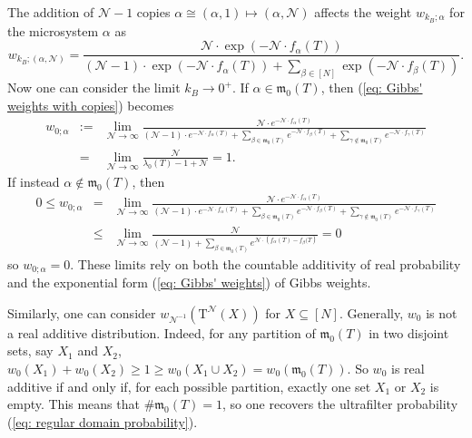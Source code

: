 \documentclass[11pt,british,reqno]{article}
\numberwithin{equation}{section}
\numberwithin{figure}{section}
\numberwithin{table}{section}
\theoremstyle{definition}
\theoremstyle{definition}
\theoremstyle{plain}
\theoremstyle{plain}
\theoremstyle{remark}
\theoremstyle{plain}
\numberwithin{equation}{section}
\numberwithin{figure}{section}
\numberwithin{table}{section}
\theoremstyle{plain}
\begin{document}
The addition of $\mathcal{N}-1$ copies
$\alpha\cong(\alpha,1)\mapsto(\alpha,\mathcal{N})$ affects the weight $w_{k_{B};\alpha}$ for the microsystem $\alpha$ as 
\begin{equation}
w_{k_{B};(\alpha,\mathcal{N})}=\frac{\mathcal{N}\cdot\exp\left(-\mathcal{N}\cdot f_{\alpha}(T)\right)}{(\mathcal{N}-1)\cdot\exp\left(-\mathcal{N}\cdot f_{\alpha}(T)\right)+{\displaystyle \sum_{\beta\in[N]}}\exp\left(-\mathcal{N}\cdot f_{\beta}(T)\right)}.\label{eq: Gibbs' weights with copies}
\end{equation}
Now one can consider the limit $k_{B}\rightarrow0^{+}$. If $\alpha\in\mathfrak{m}_{0}(T)$,
then (\ref{eq: Gibbs' weights with copies}) becomes 
\begin{eqnarray}
\displaystyle
w_{0;\alpha} & := & \lim_{\mathcal{N}\rightarrow\infty}\frac{\mathcal{N}\cdot e^{-\mathcal{N}\cdot f_{\alpha}(T)}}{(\mathcal{N}-1)\cdot e^{-\mathcal{N}\cdot f_{\alpha}(T)}+{\displaystyle \sum_{\beta\in\mathfrak{m}_{0}(T)}}e^{-\mathcal{N}\cdot f_{\beta}(T)}+{\displaystyle \sum_{\gamma\notin\mathfrak{m}_{0}(T)}}e^{-\mathcal{N}\cdot f_{\gamma}(T)}} \nonumber \\
& = & \lim_{\mathcal{N}\rightarrow\infty}\frac{\mathcal{N}}{\lambda_{0}(T)-1+\mathcal{N}}=1.\label{eq: tropical, dominant} 
\end{eqnarray}
If instead $\alpha\notin\mathfrak{m}_{0}(T)$, then 
\begin{eqnarray}
\displaystyle
0\leq w_{0;\alpha} & = & \lim_{\mathcal{N}\rightarrow\infty}\frac{\mathcal{N}\cdot e^{-\mathcal{N}\cdot f_{\alpha}(T)}}{(\mathcal{N}-1)\cdot e^{-\mathcal{N}\cdot f_{\alpha}(T)}+{\displaystyle \sum_{\beta\in\mathfrak{m}_{0}(T)}}e^{-\mathcal{N}\cdot f_{\beta}(T)}+{\displaystyle \sum_{\gamma\notin\mathfrak{m}_{0}(T)}}e^{-\mathcal{N}\cdot f_{\gamma}(T)}} \nonumber \\
& \leq & \lim_{\mathcal{N}\rightarrow\infty}\frac{\mathcal{N}}{(\mathcal{N}-1)+{\displaystyle \sum_{\beta\in\mathfrak{m}_{0}(T)}}e^{\mathcal{N}\cdot\left(f_{\alpha}(T)-f_{\beta}(T\right)}}=0 \label{eq: tropical, non-dominant} 
\end{eqnarray}
so $w_{0;\alpha}=0$. These limits rely on both the countable additivity of real probability and the exponential form (\ref{eq: Gibbs' weights}) of Gibbs weights.  

Similarly, one can consider $w_{\mathcal{N}^{-1}}(\mathrm{T}^{\mathcal{N}}(X))$ for $X\subseteq[N]$. Generally, $w_{0}$ is not a real additive distribution. Indeed, for any partition of $\mathfrak{m}_{0}(T)$ in two disjoint sets, say $X_{1}$ and $X_{2}$, $w_{0}(X_{1})+w_{0}(X_{2})\geq 1\geq w_{0}(X_{1}\cup X_{2})=w_{0}(\mathfrak{m}_{0}(T))$. So $w_{0}$ is real additive if and only if, for each possible partition, exactly one set $X_{1}$ or $X_{2}$ is empty. This means that $\#\mathfrak{m}_{0}(T)=1$, so one recovers the ultrafilter probability (\ref{eq: regular domain probability}).
\end{document}
